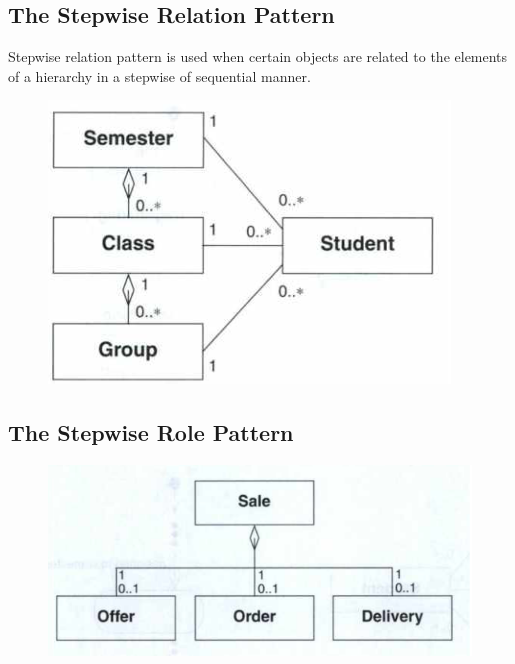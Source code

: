 \subsection*{The Stepwise Relation Pattern \ooad[104]}
Stepwise relation pattern is used when certain objects are related to the elements of a hierarchy in a stepwise of sequential manner.
\begin{figure}[H]
    \centering
    \includegraphics[width=\linewidth/2]{parts/2_problem_domain_analysis/behavior/figures/stepwise_relation.png}
\end{figure}
\subsection*{The Stepwise Role Pattern \ooad[104]}
\begin{figure}[H]
    \centering
    \includegraphics[width=\linewidth/2]{parts/2_problem_domain_analysis/behavior/figures/stepwise_role.png}
\end{figure}


